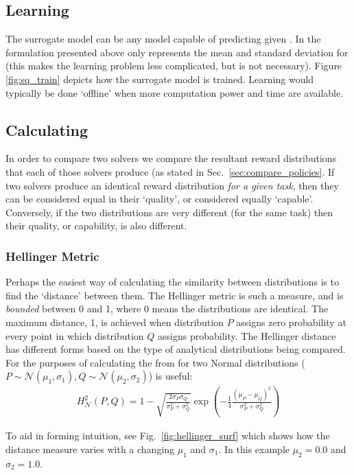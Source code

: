 \subsection{Learning \surrogate}
The surrogate model \surrogate{} can be any model capable of predicting \rwdstarapprox{} given \task. In the formulation presented above \rwdstariapprox{} only represents the mean and standard deviation for \rwdstari{} (this makes the learning problem less complicated, but is not necessary). Figure \ref{fig:sq_train} depicts how the surrogate model is trained. Learning \surrogate{} would typically be done `offline' when more computation power and time are available.

\subsection{Calculating \xQ}
In order to compare two solvers we compare the resultant reward distributions that each of those solvers produce (as stated in Sec.~\ref{sec:compare_policies}. If two solvers produce an identical reward distribution \emph{for a given task}, then they can be considered equal in their `quality', or considered equally `capable'. Conversely, if the two distributions are very different (for the same task) then their quality, or capability, is also different.

\subsubsection{Hellinger Metric} \label{sec:hellinger}
Perhaps the easiest way of calculating the similarity between distributions is to find the `distance' between them. The Hellinger metric is such a measure, and is \emph{bounded} between 0 and 1, where 0 means the distributions are identical. The maximum distance, 1, is achieved when distribution $P$ assigns zero probability at every point in which distribution $Q$ assigns probability.  The Hellinger distance has different forms based on the type of analytical distributions being compared. For the purposes of calculating \xQ{} the from for two Normal distributions ($P \sim \mathcal{N}(\mu_1,\sigma_1), Q\sim\mathcal{N}(\mu_2,\sigma_2)$) is useful:
\begin{align}
    H_{\mathcal{N}}^{2}(P,Q) = 1-\sqrt{\frac{2\sigma_P\sigma_Q}{\sigma_P^2+\sigma_Q^2}}\exp{\left(-\frac{1}{4}\frac{(\mu_P-\mu_Q)^2}{\sigma_P^2+\sigma_Q^2}\right)}
\end{align}

To aid in forming intuition, see Fig.~\ref{fig:hellinger_surf} which shows how the distance measure varies with a changing $\mu_1$ and $\sigma_1$. In this example $\mu_2=0.0$ and $\sigma_2=1.0$.


